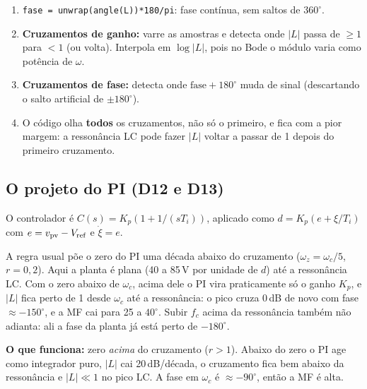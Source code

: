 
\begin{logica}
\begin{enumerate}
\item \texttt{fase = unwrap(angle(L))*180/pi}: fase cont\'inua, sem saltos de $360^\circ$.
\item \textbf{Cruzamentos de ganho:} varre as amostras e detecta onde $|L|$ passa de $\ge1$ para $<1$ (ou volta). Interpola em
 $\log|L|$, pois no Bode o m\'odulo varia como pot\^encia de $\omega$.
\item \textbf{Cruzamentos de fase:} detecta onde $\text{fase}+180^\circ$ muda de sinal (descartando o salto artificial de $\pm180^\circ$).
\item O c\'odigo olha \textbf{todos} os cruzamentos, n\~ao s\'o o primeiro, e fica com a pior margem: a resson\^ancia LC pode
 fazer $|L|$ voltar a passar de 1 depois do primeiro cruzamento.
\end{enumerate}
\end{logica}

\subsection{O projeto do PI (D12 e D13)}

O controlador \'e $C(s)=K_p(1+1/(sT_i))$, aplicado como $d=K_p(e+\xi/T_i)$ com $e=v_{\mathrm{pv}}-V_{\mathrm{ref}}$ e $\dot\xi=e$.

\begin{atencao}
A regra usual p\~oe o zero do PI uma d\'ecada abaixo do cruzamento ($\omega_z=\omega_c/5$, $r=0{,}2$). Aqui a planta \'e plana
(40 a 85\,V por unidade de $d$) at\'e a resson\^ancia LC. Com o zero abaixo de $\omega_c$, acima dele o PI vira praticamente s\'o o
ganho $K_p$, e $|L|$ fica perto de 1 desde $\omega_c$ at\'e a resson\^ancia: o pico cruza 0\,dB de novo com fase
$\approx-150^\circ$, e a MF cai para 25 a $40^\circ$. Subir $f_c$ acima da resson\^ancia tamb\'em n\~ao adianta: ali a fase da planta j\'a
est\'a perto de $-180^\circ$.
\end{atencao}

\textbf{O que funciona:} zero \emph{acima} do cruzamento ($r>1$). Abaixo do zero o PI age como integrador puro, $|L|$ cai
20\,dB/d\'ecada, o cruzamento fica bem abaixo da resson\^ancia e $|L|\ll1$ no pico LC. A fase em $\omega_c$ \'e $\approx-90^\circ$, ent\~ao a
MF \'e alta.

